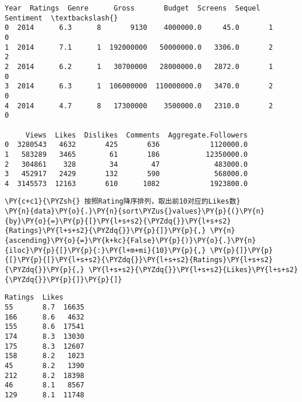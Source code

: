             \begin{tcolorbox}[breakable, size=fbox, boxrule=.5pt, pad at break*=1mm, opacityfill=0]
\begin{Verbatim}[commandchars=\\\{\}]
   Year  Ratings  Genre      Gross       Budget  Screens  Sequel  Sentiment  \textbackslash{}
0  2014      6.3      8       9130    4000000.0     45.0       1          0
1  2014      7.1      1  192000000   50000000.0   3306.0       2          2
2  2014      6.2      1   30700000   28000000.0   2872.0       1          0
3  2014      6.3      1  106000000  110000000.0   3470.0       2          0
4  2014      4.7      8   17300000    3500000.0   2310.0       2          0

     Views  Likes  Dislikes  Comments  Aggregate.Followers
0  3280543   4632       425       636            1120000.0
1   583289   3465        61       186           12350000.0
2   304861    328        34        47             483000.0
3   452917   2429       132       590             568000.0
4  3145573  12163       610      1082            1923800.0
\end{Verbatim}
\end{tcolorbox}
        
    \begin{tcolorbox}[breakable, size=fbox, boxrule=1pt, pad at break*=1mm,colback=cellbackground, colframe=cellborder]
\begin{Verbatim}[commandchars=\\\{\}]
\PY{c+c1}{\PYZsh{} 按照Rating降序排列，取出前10对应的Likes数}
\PY{n}{data}\PY{o}{.}\PY{n}{sort\PYZus{}values}\PY{p}{(}\PY{n}{by}\PY{o}{=}\PY{p}{[}\PY{l+s+s2}{\PYZdq{}}\PY{l+s+s2}{Ratings}\PY{l+s+s2}{\PYZdq{}}\PY{p}{]}\PY{p}{,} \PY{n}{ascending}\PY{o}{=}\PY{k+kc}{False}\PY{p}{)}\PY{o}{.}\PY{n}{iloc}\PY{p}{[}\PY{p}{:}\PY{l+m+mi}{10}\PY{p}{,} \PY{p}{]}\PY{p}{[}\PY{p}{[}\PY{l+s+s2}{\PYZdq{}}\PY{l+s+s2}{Ratings}\PY{l+s+s2}{\PYZdq{}}\PY{p}{,} \PY{l+s+s2}{\PYZdq{}}\PY{l+s+s2}{Likes}\PY{l+s+s2}{\PYZdq{}}\PY{p}{]}\PY{p}{]}
\end{Verbatim}
\end{tcolorbox}

            \begin{tcolorbox}[breakable, size=fbox, boxrule=.5pt, pad at break*=1mm, opacityfill=0]
\begin{Verbatim}[commandchars=\\\{\}]
     Ratings  Likes
55       8.7  16635
166      8.6   4632
155      8.6  17541
174      8.3  13030
175      8.3  12607
158      8.2   1023
45       8.2   1390
212      8.2  18398
46       8.1   8567
129      8.1  11748
\end{Verbatim}
\end{tcolorbox}
